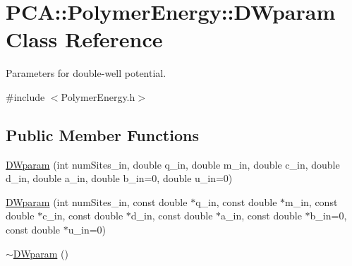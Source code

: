\hypertarget{class_p_c_a_1_1_polymer_energy_1_1_d_wparam}{}\section{P\+CA\+:\+:Polymer\+Energy\+:\+:D\+Wparam Class Reference}
\label{class_p_c_a_1_1_polymer_energy_1_1_d_wparam}


Parameters for double-\/well potential.  




{\ttfamily \#include $<$Polymer\+Energy.\+h$>$}

\subsection*{Public Member Functions}
\begin{DoxyCompactItemize}
\item 
\hyperlink{class_p_c_a_1_1_polymer_energy_1_1_d_wparam_a803a7fd6bcd83efd7934ad06a5fe6b71}{D\+Wparam} (int num\+Sites\+\_\+in, double q\+\_\+in, double m\+\_\+in, double c\+\_\+in, double d\+\_\+in, double a\+\_\+in, double b\+\_\+in=0, double u\+\_\+in=0)
\item 
\hyperlink{class_p_c_a_1_1_polymer_energy_1_1_d_wparam_af9a9a24e85422d933fb527ef43a620a0}{D\+Wparam} (int num\+Sites\+\_\+in, const double $\ast$q\+\_\+in, const double $\ast$m\+\_\+in, const double $\ast$c\+\_\+in, const double $\ast$d\+\_\+in, const double $\ast$a\+\_\+in, const double $\ast$b\+\_\+in=0, const double $\ast$u\+\_\+in=0)
\item 
\hyperlink{class_p_c_a_1_1_polymer_energy_1_1_d_wparam_a97b71972cd114d0a5a0aed004ec3a9f8}{$\sim$\+D\+Wparam} ()
\end{DoxyCompactItemize}
